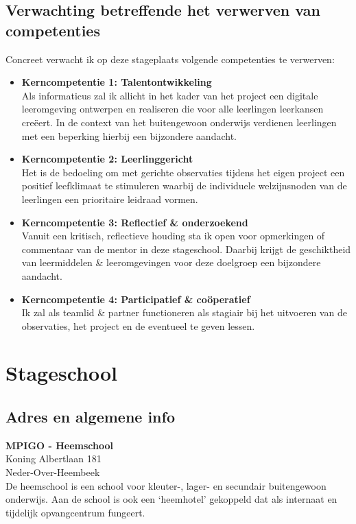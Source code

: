 \documentclass[a4paper,11pt]{article}
\theoremstyle{definition}
\begin{document}
\subsection{Verwachting betreffende het verwerven van competenties}
Concreet verwacht ik op deze stageplaats volgende competenties te verwerven:
\begin{itemize}
  \item \textbf{Kerncompetentie 1: Talentontwikkeling}\\
  Als informaticus zal ik allicht in het kader van het project een digitale 
  leeromgeving ontwerpen en realiseren die voor alle leerlingen leerkansen 
  creëert. In de context van het buitengewoon onderwijs verdienen leerlingen met 
  een beperking hierbij een bijzondere aandacht.
 \item \textbf{Kerncompetentie 2: Leerlinggericht}\\
  Het is de bedoeling om met gerichte observaties tijdens het eigen project een 
  positief leefklimaat te stimuleren waarbij de individuele welzijnsnoden van de 
  leerlingen een prioritaire leidraad vormen.
   \item \textbf{Kerncompetentie 3: Reflectief \& onderzoekend}\\
Vanuit een kritisch, reflectieve houding sta ik open voor opmerkingen of commentaar 
van de mentor in deze stageschool. Daarbij krijgt de geschiktheid van 
leermiddelen \& leeromgevingen voor deze doelgroep een bijzondere aandacht.
\item \textbf{Kerncompetentie 4: Participatief \& coöperatief}\\
Ik zal als teamlid \& partner functioneren als stagiair bij het uitvoeren van de 
observaties, het project en de eventueel te geven lessen.
\end{itemize}
\newpage

\section{Stageschool}
\subsection{Adres en algemene info}
\textbf{MPIGO - Heemschool}\\
\noindent 	Koning Albertlaan 181\\
 Neder-Over-Heembeek\\

\noindent De heemschool is een school voor kleuter-, lager- en secundair buitengewoon 
onderwijs. Aan de school is ook een `heemhotel' gekoppeld dat als internaat en 
tijdelijk opvangcentrum fungeert. 
\end{document}
